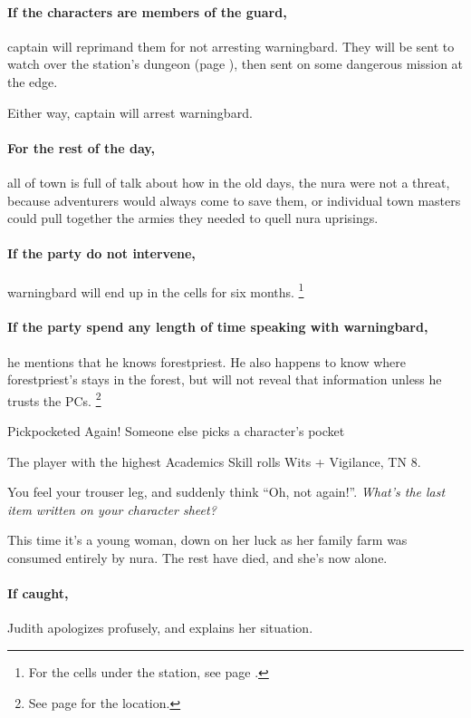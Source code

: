 \begin{multicols}{2}
\paragraph{If the characters are members of the \gls{guard},}
\gls{captain} will reprimand them for not arresting \gls{warningbard}.
They will be sent to watch over the station's dungeon (page \pageref{stationDungeon}), then sent on some dangerous mission at the \gls{edge}.

Either way, \gls{captain} will arrest \gls{warningbard}.

\paragraph{For the rest of the day,}
all of \gls{town} is full of talk about how in the old days, the nura were not a threat, because adventurers would always come to save them, or individual town masters could pull together the armies they needed to quell nura uprisings.

\paragraph{If the party do not intervene,}
\gls{warningbard} will end up in the cells for six months.
\footnote{For the cells under the  station, see page \pageref{guardstation}.}

\warningbard

\paragraph{If the party spend any length of time speaking with \gls{warningbard},}
he mentions that he knows \gls{forestpriest}.
He also happens to know where \gls{forestpriest}'s stays in the forest, but will not reveal that information unless he trusts the PCs.
\footnote{See page \pageref{lostcity} for the location.}

{Pickpocketed Again!}%
{Someone else picks a character's pocket}%

The player with the highest Academics Skill rolls Wits + Vigilance, TN 8.

\begin{boxtext}

  You feel your trouser leg, and suddenly think ``Oh, not again!''.  \textit{What's the last item written on your character sheet?}

\end{boxtext}

This time it's a young woman, down on her luck as her family farm was consumed entirely by nura.
The rest have died, and she's now alone.

\paragraph{If caught,}
Judith apologizes profusely, and explains her situation.



\end{multicols}

\stopcontents[Town]
\stopcontents[sq]
